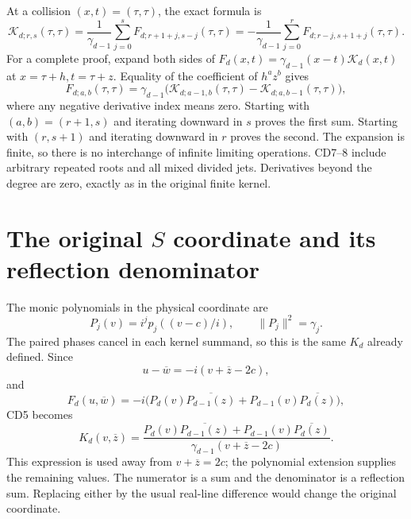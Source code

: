 \documentclass[11pt]{article}
\begin{document}
At a collision \((x,t)=(\tau,\tau)\), the exact formula is
\begin{equation}\label{eq:jets-collision}
 \boxed{\mathcal K_{d;r,s}(\tau,\tau)
  =\frac1{\gamma_{d-1}}
      \sum_{j=0}^{s}F_{d;r+1+j,s-j}(\tau,\tau)
  =-\frac1{\gamma_{d-1}}
      \sum_{j=0}^{r}F_{d;r-j,s+1+j}(\tau,\tau).}
 \tag{CD8}
\end{equation}
For a complete proof, expand both sides of
\(F_d(x,t)=\gamma_{d-1}(x-t)\mathcal K_d(x,t)\) at
\(x=\tau+h,t=\tau+z\). Equality of the coefficient of \(h^az^b\)
gives
\[
 F_{d;a,b}(\tau,\tau)=\gamma_{d-1}
 \bigl(\mathcal K_{d;a-1,b}(\tau,\tau)
       -\mathcal K_{d;a,b-1}(\tau,\tau)\bigr),
\]
where any negative derivative index means zero. Starting with
\((a,b)=(r+1,s)\) and iterating downward in \(s\) proves the first
sum. Starting with \((r,s+1)\) and iterating downward in \(r\)
proves the second. The expansion is finite, so there is no interchange
of infinite limiting operations. CD7--8 include arbitrary repeated
roots and all mixed divided jets. Derivatives beyond the degree are
zero, exactly as in the original finite kernel.

\section{The original \(S\) coordinate and its reflection denominator}

The monic polynomials in the physical coordinate are
\[
 P_j(v)=i^jp_j((v-c)/i),\qquad \|P_j\|^2=\gamma_j.
\]
The paired phases cancel in each kernel summand, so this is the same
\(K_d\) already defined. Since
\[
 u-\overline w=-i(v+\overline z-2c),
\]
and
\[
 F_d(u,\overline w)=-i\bigl(
 P_d(v)\overline{P_{d-1}(z)}+
 P_{d-1}(v)\overline{P_d(z)}\bigr),
\]
CD5 becomes
\begin{equation}\label{eq:S-CD}
 \boxed{K_d(v,\overline z)=
 \frac{P_d(v)\overline{P_{d-1}(z)}+
       P_{d-1}(v)\overline{P_d(z)}}
      {\gamma_{d-1}(v+\overline z-2c)}.}
 \tag{CD9}
\end{equation}
This expression is used away from \(v+\overline z=2c\); the
polynomial extension supplies the remaining values. The numerator is a
sum and the denominator is a reflection sum. Replacing either by the
usual real-line difference would change the original coordinate.
\end{document}
